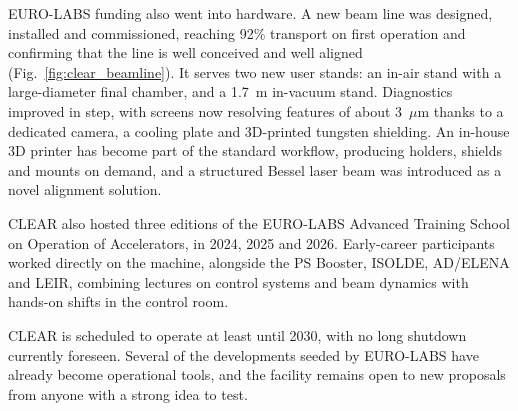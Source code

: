 EURO-LABS funding also went into hardware. A new beam line was designed, installed and commissioned, reaching 92\% transport on first operation and confirming that the line is well conceived and well aligned (Fig.~\ref{fig:clear_beamline}). It serves two new user stands: an in-air stand with a large-diameter final chamber, and a 1.7~m in-vacuum stand. Diagnostics improved in step, with screens now resolving features of about 3~$\mu$m thanks to a dedicated camera, a cooling plate and 3D-printed tungsten shielding. An in-house 3D printer has become part of the standard workflow, producing holders, shields and mounts on demand, and a structured Bessel laser beam was introduced as a novel alignment solution.

CLEAR also hosted three editions of the EURO-LABS Advanced Training School on Operation of Accelerators, in 2024, 2025 and 2026. Early-career participants worked directly on the machine, alongside the PS Booster, ISOLDE, AD/ELENA and LEIR, combining lectures on control systems and beam dynamics with hands-on shifts in the control room.

CLEAR is scheduled to operate at least until 2030, with no long shutdown currently foreseen. Several of the developments seeded by EURO-LABS have already become operational tools, and the facility remains open to new proposals from anyone with a strong idea to test.

